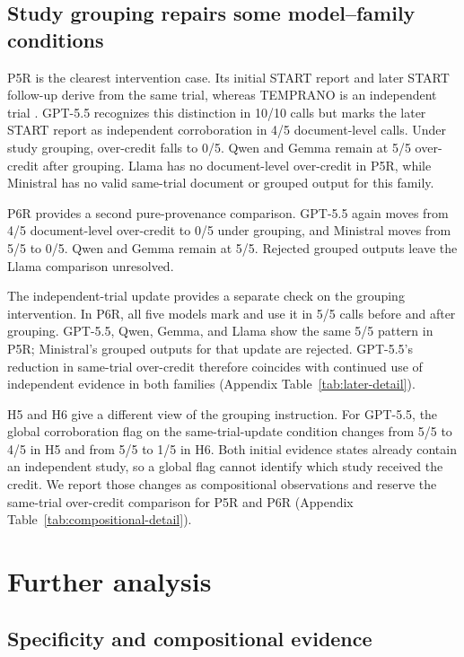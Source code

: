 \documentclass[11pt]{article}
\begin{document}
\subsection{Study grouping repairs some model--family conditions}

P5R is the clearest intervention case. Its initial START report and later START follow-up derive from the same trial, whereas TEMPRANO is an independent trial \citep{lundgren-etal-2015-start,lundgren-etal-2023-start-followup,danel-etal-2015-temprano}. GPT-5.5 recognizes this distinction in 10/10 calls but marks the later START report as independent corroboration in 4/5 document-level calls. Under study grouping, over-credit falls to 0/5. Qwen and Gemma remain at 5/5 over-credit after grouping. Llama has no document-level over-credit in P5R, while Ministral has no valid same-trial document or grouped output for this family.

P6R provides a second pure-provenance comparison. GPT-5.5 again moves from 4/5 document-level over-credit to 0/5 under grouping, and Ministral moves from 5/5 to 0/5. Qwen and Gemma remain at 5/5. Rejected grouped outputs leave the Llama comparison unresolved.

The independent-trial update provides a separate check on the grouping intervention. In P6R, all five models mark and use it in 5/5 calls before and after grouping. GPT-5.5, Qwen, Gemma, and Llama show the same 5/5 pattern in P5R; Ministral's grouped outputs for that update are rejected. GPT-5.5's reduction in same-trial over-credit therefore coincides with continued use of independent evidence in both families (Appendix Table~\ref{tab:later-detail}).

H5 and H6 give a different view of the grouping instruction. For GPT-5.5, the global corroboration flag on the same-trial-update condition changes from 5/5 to 4/5 in H5 and from 5/5 to 1/5 in H6. Both initial evidence states already contain an independent study, so a global flag cannot identify which study received the credit. We report those changes as compositional observations and reserve the same-trial over-credit comparison for P5R and P6R (Appendix Table~\ref{tab:compositional-detail}).

\section{Further analysis}
\label{sec:further-analysis}

\subsection{Specificity and compositional evidence}
\end{document}

